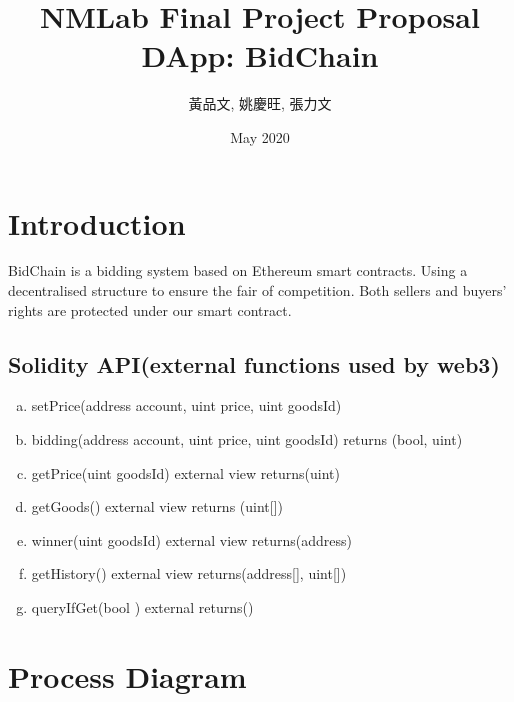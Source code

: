 \documentclass[12pt]{extarticle}
\begin{document}
\begin{CJK*}{UTF8}{bkai}
\title{NMLab Final Project Proposal \\ DApp: BidChain}
\author{黃品文, 姚慶旺, 張力文}
\date{May 2020}
    \maketitle

    \section*{Introduction}
        BidChain is a bidding system based on Ethereum smart contracts. Using a decentralised structure to ensure the fair of competition. 
        Both sellers and buyers' rights are protected under our smart contract.

    \subsection*{Solidity API(external functions used by web3)}
        \begin{enumerate}[(a)]
            \item setPrice(address account, uint price, uint goodsId)
            \item bidding(address account, uint price, uint goodsId)  returns (bool, uint)
            \item getPrice(uint goodsId) external view returns(uint)
            \item getGoods() external view returns (uint[])
            \item winner(uint goodsId) external view returns(address)
            \item getHistory() external view returns(address[], uint[])
            \item queryIfGet(bool ) external returns()
        \end{enumerate}

    \section*{Process Diagram}
    	\begin{center}
\end{center}
\end{CJK*}
\end{document}
